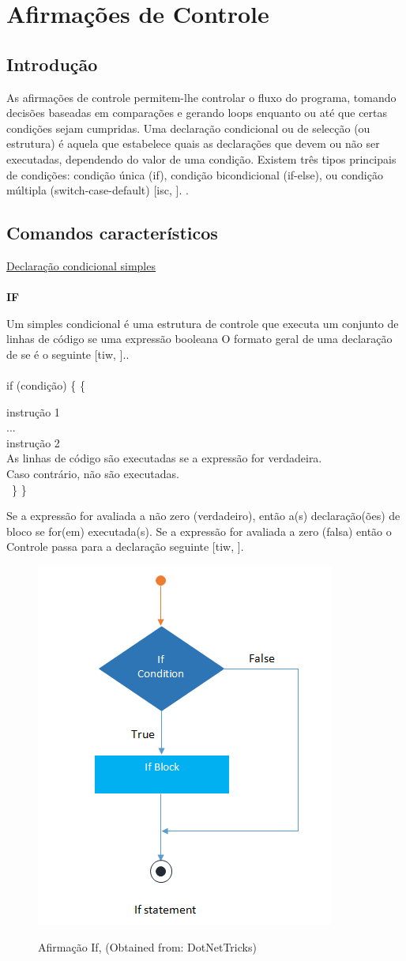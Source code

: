 \documentclass[11pt, letterpaper, portuguese]{article}
\begin{document}
\newpage 
\section{Afirmações de Controle}
\subsection{Introdução}
\par{As afirmações de controle permitem-lhe controlar o fluxo do programa, tomando decisões baseadas em comparações
e gerando loops enquanto ou até que certas condições sejam cumpridas. Uma declaração condicional ou de selecção (ou
estrutura) é aquela que estabelece quais as declarações que devem ou não ser executadas, dependendo do valor de
uma condição. Existem três tipos principais de condições: condição única (if), condição bicondicional (if-else), ou
condição múltipla (switch-case-default) [isc, ].} \cite{iscyp_2017}.
    \subsection{Comandos característicos}
    \vspace{1 cm}
    \underline{Declaração condicional simples}
   \\
    \\
    \textbf{IF}
    \par{Um simples condicional é uma estrutura de controle que executa um conjunto de linhas de código se uma expressão booleana
O formato geral de uma declaração de se é o seguinte [tiw, ].}.
    \\
    \\
    if (condição) \{ \{
    
    instrução 1
     \\
     ...
     \\
     instrução 2
     \\
     As linhas de código são executadas se a expressão for verdadeira.
     \\
     Caso contrário, não são executadas.
     \\
\
\}
\}
\\
\par{Se a expressão for avaliada a não zero (verdadeiro), então a(s) declaração(ões) de bloco se for(em) executada(s). Se a expressão for avaliada a zero (falsa) então o Controle passa para a declaração seguinte [tiw, ].}
\\
\begin{figure}
	    \centering
		\caption{ Afirmação If, (Obtained from: {DotNetTricks})}
		\includegraphics[width=0.2 \textwidth]{ifstatement.png}
		\label{Imagen_if}
	\end{figure}
	
\end{document}
